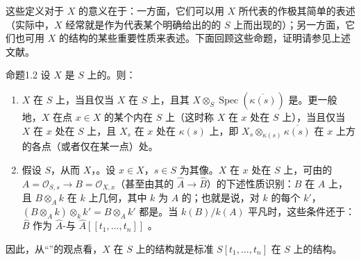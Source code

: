 这些定义对于 $X$ 的意义在于：一方面，它们可以用 $X$ 所代表的作极其简单的表述（实际中，$X$ 经常就是作为代表某个明确给出的的 $S$ 上而出现的）；另一方面，它们也可用 $X$ 的结构的某些重要性质来表述。下面回顾这些命题，证明请参见上述文献。
\begin{SGAresult}{命题}{1.2}
设 $X$ 是 $S$ 上的。则：
\begin{enumerate}
\item[(i)] $X$ 在 $S$ 上，当且仅当 $X$ 在 $S$ 上，且其 $X\otimes_S\operatorname{Spec}(\overline{\kappa(s)})$ 是。更一般地，$X$ 在点 $x\in X$ 的某个内在 $S$ 上（这时称 $X$ 在 $x$ 处在 $S$ 上），当且仅当 $X$ 在 $x$ 处在 $S$ 上，且 $X_s$ 在 $x$ 处在 $\kappa(s)$ 上，即 $X_s\otimes_{\kappa(s)}\overline{\kappa(s)}$ 在 $x$ 上方的各点（或者仅在某一点）处。
\item[(ii)] 假设 $S$，从而 $X$，。设 $x\in X$，$s\in S$ 为其像。$X$ 在 $x$ 处在 $S$ 上，可由的 $A=\mathscr O_{S,s}\to B=\mathscr O_{X,x}$（甚至由其的 $\widehat A\to\widehat B$）的下述性质识别：$B$ 在 $A$ 上，且 $B\otimes_A k$ 在 $k$ 上几何，其中 $k$ 为 $A$ 的；也就是说，对 $k$ 的每个 $k'$，$(B\otimes_A k)\otimes_k k'=B\otimes_A k'$ 都是。当 $k(B)/k(A)$ 平凡时，这些条件还于：$\widehat B$ 作为 $\widehat A$-与 $\widehat A[[t_1,\ldots,t_n]]$ 。
\end{enumerate}
\end{SGAresult}
因此，从“”的观点看，$X$ 在 $S$ 上的结构就是标准 $S[t_1,\ldots,t_n]$ 在 $S$ 上的结构。
